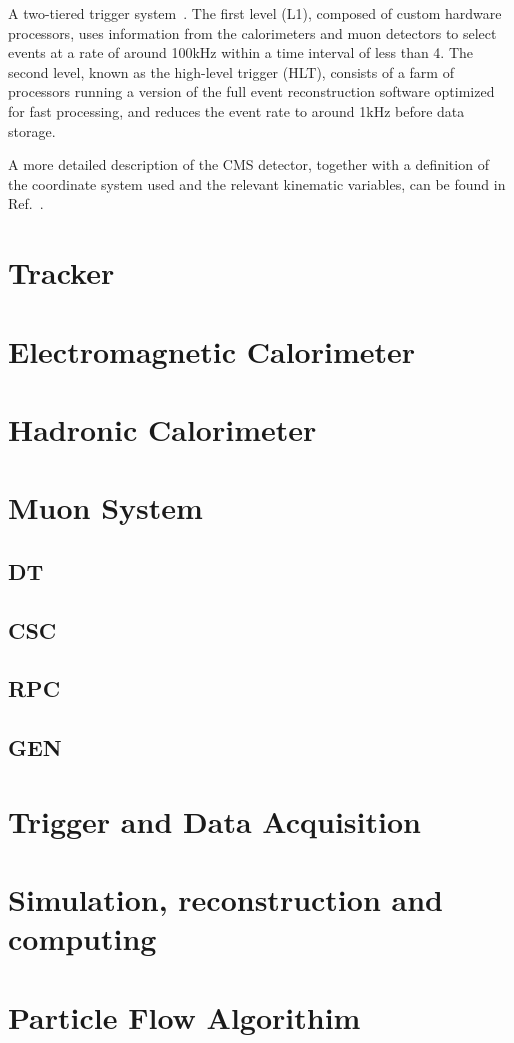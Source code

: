 A two-tiered trigger system~\cite{Khachatryan:2016bia}. The first level (L1), composed of custom hardware processors, uses information from the calorimeters and muon detectors to select events at a rate of around 100\unit{kHz} within a time interval of less than 4\mus. The second level, known as the high-level trigger (HLT), consists of a farm of processors running a version of the full event reconstruction software optimized for fast processing, and reduces the event rate to around 1\unit{kHz} before data storage.

A more detailed description of the CMS detector, together with a definition of the coordinate system used and the relevant kinematic variables, can be found in Ref.~\cite{Chatrchyan:2008zzk}.  


\section{Tracker}
\section{Electromagnetic Calorimeter}
\section{Hadronic Calorimeter}
\section{Muon System}
\subsection{DT}
\subsection{CSC}
\subsection{RPC}
\subsection{GEN}
\section{Trigger and Data Acquisition}
\section{Simulation, reconstruction and computing}
\section{Particle Flow Algorithim}
